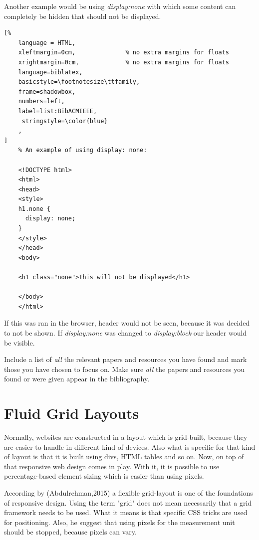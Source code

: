Another example would be using \emph{display:none} with which some content can completely be hidden that should not be 
displayed.

\begin{lstlisting}[%
    language = HTML, 
    xleftmargin=0cm,              % no extra margins for floats
    xrightmargin=0cm,             % no extra margins for floats
    language=biblatex,
    basicstyle=\footnotesize\ttfamily,
    frame=shadowbox,
    numbers=left,
    label=list:BibACMIEEE,
     stringstyle=\color{blue}
    ,
]
    % An example of using display: none:

    <!DOCTYPE html>
    <html>
    <head>
    <style>
    h1.none {
      display: none;
    }
    </style>
    </head>
    <body>

    <h1 class="none">This will not be displayed</h1>

    </body>
    </html>

\end{lstlisting}




%
If this was ran in the browser, header would not be seen, because
it was decided to not be shown. If \emph{display:none} was changed to \emph{display:block}
our header would be visible.

Include a list of \emph{all} the relevant papers and resources you
have found and mark those you have chosen to focus on. Make sure
\emph{all} the papers and resources you found or were given appear in
the bibliography.




\section{Fluid Grid Layouts}

Normally, websites are constructed in a layout which is grid-built, because they are
easier to handle in different kind of devices. Also what is specific
for that kind of layout is that it is built using divs, HTML tables and so on. Now, on top of that
responsive web design comes in play\parencite{5}. With it, it is possible to use percentage-based element sizing which is easier than using pixels. 

According by (Abdulrehman,2015) a flexible grid-layout is one of the foundations of responsive
design. Using the term "grid" does not mean necessarily that a grid framework needs to be used.
What it means is that specific CSS tricks are used for positioning. Also, he suggest that 
using pixels for the measurement unit should be stopped, because pixels can vary. 

